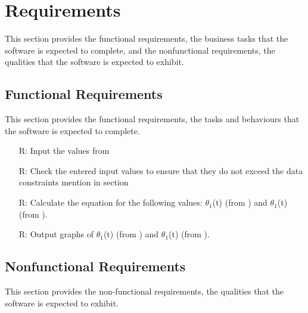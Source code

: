 \documentclass[12pt]{article}
\newcounter{reqnum} %
\begin{document}
\section{Requirements}\label{sec_req}
This section provides the functional requirements, the business tasks that the
software is expected to complete, and the nonfunctional requirements, the
qualities that the software is expected to exhibit.

\subsection{Functional Requirements}\label{sec_funReq}
This section provides the functional requirements, the tasks and behaviours that the software is expected to complete. \\
\noindent \begin{itemize}

\item[R\refstepcounter{reqnum}\thereqnum \label{R_Inputs}:] 
Input the values from 
\item[R\refstepcounter{reqnum}\thereqnum \label{R_VarifyInputs}:]  
Check the entered input values to ensure that they do not exceed the data constraints mention in section~
\item[R\refstepcounter{reqnum}\thereqnum \label{R_Calculate}:] Calculate the equation for the following values: $\theta_1$(t) (from ) and $\theta_1$(t) (from ).

\item[R\refstepcounter{reqnum}\thereqnum \label{R_Output}:] Output graphs of $\theta_1$(t) (from ) and $\theta_1$(t) (from ).

\end{itemize}

\subsection{Nonfunctional Requirements}\label{sec_nfr}
This section provides the non-functional requirements, the qualities that the software is expected to exhibit.
\end{document}
